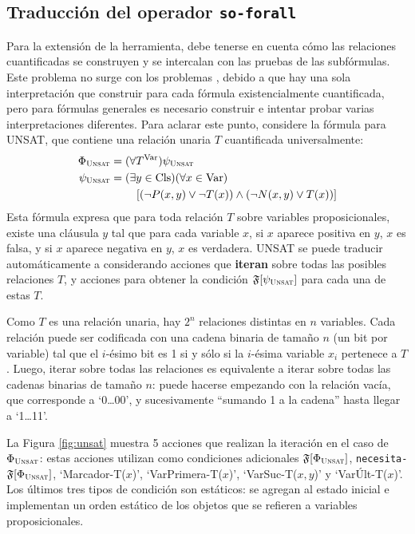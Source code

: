 \subsection{Traducción del operador \texttt{so-forall}}
Para la extensión de la herramienta, debe tenerse en cuenta cómo las relaciones
cuantificadas se construyen y se intercalan con las pruebas de las subfórmulas.
Este problema no surge con los problemas \SOE, debido a que hay una sola
interpretación que construir para cada fórmula existencialmente cuantificada,
pero para fórmulas generales es necesario construir e intentar probar varias
interpretaciones diferentes.
Para aclarar este punto, considere la fórmula para UNSAT, que contiene una
relación unaria $T$ cuantificada universalmente:
\begin{alignat*}{1}
\Phi_{\textsc{Unsat}} &= (\forall T^\text{Var})\psi_{\textsc{Unsat}} \\
\psi_{\textsc{Unsat}} &= (\exists y\in\text{Cls})(\forall x\in\text{Var}) \\
            &\quad\quad\ [(\neg P(x,y) \lor \neg T(x))\land(\neg N(x,y)\lor T(x))]
\end{alignat*}
Esta fórmula expresa que para toda relación $T$ sobre variables
proposicionales, existe una cláusula $y$ tal que para cada variable $x$, si $x$
aparece positiva en $y$, $x$ es falsa, y si $x$ aparece negativa en $y$, $x$ es
verdadera.
UNSAT se puede traducir automáticamente a \STRIPS considerando acciones que
\textbf{iteran} sobre todas las posibles relaciones $T$, y acciones para
obtener la condición $\mathfrak{F}[\psi_{\textsc{Unsat}}]$ para cada una de estas $T$.

Como $T$ es una relación unaria, hay $2^n$ relaciones distintas en $n$
variables. Cada relación puede ser codificada con una cadena binaria
de tamaño $n$ (un bit por variable) tal que el $i$-ésimo bit es 1 si y sólo si
la $i$-ésima variable $x_i$ pertenece a $T$. Luego, iterar sobre todas las
relaciones es equivalente a iterar sobre todas las cadenas binarias de tamaño
$n$: puede hacerse empezando con la relación vacía, que corresponde a
`0\ldots00', y sucesivamente ``sumando 1 a la cadena'' hasta llegar a `1\ldots11'.

La Figura \ref{fig:unsat} muestra 5 acciones que realizan la iteración en el
caso de $\Phi_{\textsc{Unsat}}$: estas
acciones utilizan como condiciones adicionales $\mathfrak{F}[\Phi_{\textsc{Unsat}}]$,
\texttt{necesita-}$\mathfrak{F}[\Phi_{\textsc{Unsat}}]$, `Marcador-T($x$)', `VarPrimera-T($x$)',
`VarSuc-T($x,y$)' y `VarÚlt-T($x$)'. Los últimos tres tipos de condición son
estáticos: se agregan al estado inicial e implementan un orden estático de los
objetos que se refieren a variables proposicionales.

